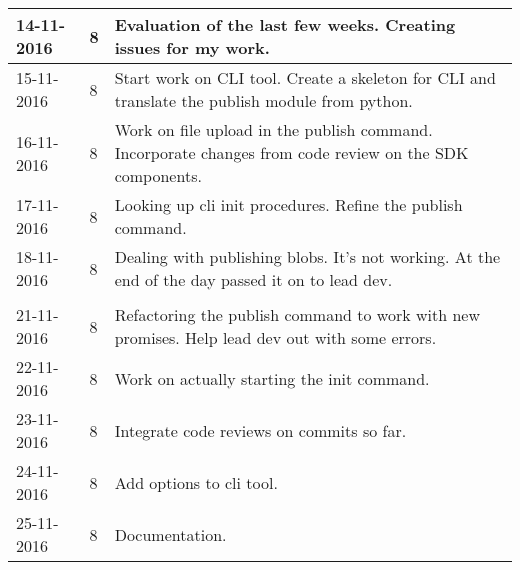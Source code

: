 \begin{tabular}{|p{2cm}|p{1cm}|p{10cm}|}
	\hline
	14-11-2016 & 8 & Evaluation of the last few weeks. Creating issues for my work. \\ \hline
	15-11-2016 & 8 & Start work on CLI tool. Create a skeleton for CLI and translate the publish module from python. \\ \hline
	16-11-2016 & 8 & Work on file upload in the publish command. Incorporate changes from code review on the SDK components. \\ \hline
	17-11-2016 & 8 & Looking up cli init procedures. Refine the publish command. \\ \hline
	18-11-2016 & 8 & Dealing with publishing blobs. It's not working. At the end of the day passed it on to lead dev. \\ \hline
	
	\\ \hline
	
	21-11-2016 & 8 & Refactoring the publish command to work with new promises. Help lead dev out with some errors. \\ \hline
	22-11-2016 & 8 & Work on actually starting the init command. \\ \hline
	23-11-2016 & 8 & Integrate code reviews on commits so far. \\ \hline
	24-11-2016 & 8 & Add options to cli tool. \\ \hline
	25-11-2016 & 8 & Documentation. \\ \hline
	
\end{tabular}